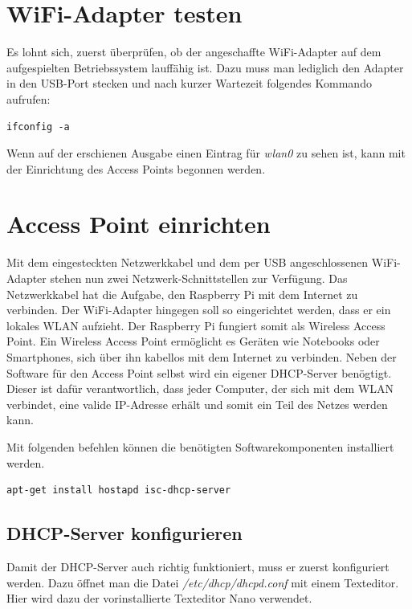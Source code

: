 \section{WiFi-Adapter testen}
Es lohnt sich, zuerst überprüfen, ob der angeschaffte WiFi-Adapter auf dem aufgespielten Betriebssystem lauffähig ist. Dazu muss man lediglich den Adapter in den USB-Port stecken und nach kurzer Wartezeit folgendes Kommando aufrufen:

\begin{lstlisting}
ifconfig -a
\end{lstlisting}

Wenn auf der erschienen Ausgabe einen Eintrag für \textit{wlan0} zu sehen ist, kann mit der Einrichtung des Access Points begonnen werden.


\section{Access Point einrichten}
Mit dem eingesteckten Netzwerkkabel und dem per USB angeschlossenen WiFi-Adapter stehen nun zwei Netzwerk-Schnittstellen zur Verfügung. Das Netzwerkkabel hat die Aufgabe, den Raspberry Pi mit dem Internet zu verbinden. Der WiFi-Adapter hingegen soll so eingerichtet werden, dass er ein lokales WLAN aufzieht. Der Raspberry Pi fungiert somit als Wireless Access Point. Ein Wireless Access Point ermöglicht es Geräten wie Notebooks oder Smartphones, sich über ihn kabellos mit dem Internet zu verbinden. Neben der Software für den Access Point selbst wird ein eigener DHCP-Server benögtigt. Dieser ist dafür verantwortlich, dass jeder Computer, der sich mit dem WLAN verbindet, eine valide IP-Adresse erhält und somit ein Teil des Netzes werden kann.

Mit folgenden befehlen können die benötigten Softwarekomponenten installiert werden.
 
\begin{lstlisting}
apt-get install hostapd isc-dhcp-server
\end{lstlisting}

\subsection{DHCP-Server konfigurieren}
Damit der DHCP-Server auch richtig funktioniert, muss er zuerst konfiguriert werden.
Dazu öffnet man die Datei \textit{/etc/dhcp/dhcpd.conf} mit einem Texteditor. Hier wird dazu der vorinstallierte Texteditor Nano verwendet.

